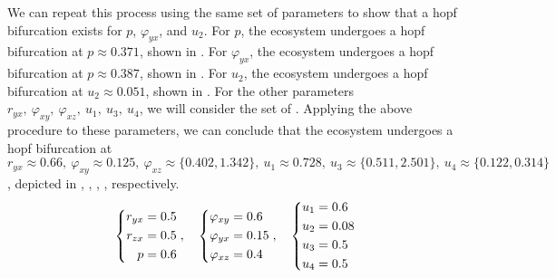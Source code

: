 We can repeat this process using the same set of parameters to show that a hopf bifurcation exists for $p$, $\varphi_{yx}$, and $u_2$. For $p$, the ecosystem undergoes a hopf bifurcation at $p\approx 0.371$, shown in . For $\varphi_{yx}$, the ecosystem undergoes a hopf bifurcation at $p\approx 0.387$, shown in . For $u_2$, the ecosystem undergoes a hopf bifurcation at $u_2\approx 0.051$, shown in . For the other parameters $r_{yx},\ \varphi_{xy},\ \varphi_{xz},\ u_1,\ u_3,\ u_4$, we will consider the set of . Applying the above procedure to these parameters, we can conclude that the ecosystem undergoes a hopf bifurcation at $r_{yx}\approx 0.66,\ \varphi_{xy}\approx 0.125,\ \varphi_{xz}\approx\{0.402,1.342\},\ u_1\approx 0.728,\ u_3\approx\{0.511,2.501\},\ u_4\approx\{0.122,0.314\}$, depicted in , , , ,  respectively.
\begin{equation}\label{params:interior-b}
    \begin{dcases}
        \begin{aligned}
            r_{yx} &= 0.5\\
            r_{zx} &= 0.5\\
            p &= 0.6
        \end{aligned}
    \end{dcases},\quad 
    \begin{dcases}
        \begin{aligned}
            \varphi_{xy} &= 0.6\\
            \varphi_{yx} &= 0.15\\
            \varphi_{xz} &= 0.4
        \end{aligned}
    \end{dcases},\quad
    \begin{dcases}
        \begin{aligned}
            u_1 &= 0.6\\
            u_2 &= 0.08\\
            u_3 &= 0.5\\
            u_4 &= 0.5
        \end{aligned}
    \end{dcases}
\end{equation}
